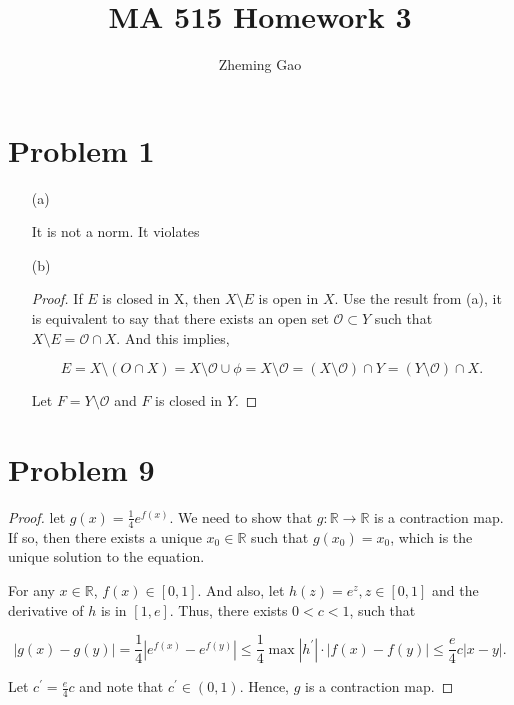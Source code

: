 \documentclass[12pt]{article}
\begin{document}
 
 
\title{MA 515 Homework 3}
\author{Zheming Gao}
\maketitle

\section*{Problem 1}

\begin{enumerate}
\item [(a)]

It is not a norm. It violates 







\vspace{60mm}

\item [(b)]

\begin{proof}

If $E$ is closed in X, then $X \setminus E$ is open in $X$. Use the result from (a), it is equivalent to say that there exists an open set $\mathcal{O} \subset Y$ such that $X\setminus E = \mathcal{O} \cap X$. And this implies,

$$
E = X\setminus (O\cap X) = X \setminus \mathcal{O} \cup \phi = X \setminus \mathcal{O} = ( X \setminus \mathcal{O}) \cap Y = (Y\setminus \mathcal{O}) \cap X.
$$

Let $F = Y\setminus \mathcal{O}$ and $F$ is closed in $Y$.

\end{proof}

\end{enumerate}


\section*{Problem 9}

\begin{proof}

let $g(x) = \frac{1}{4} e^{f(x)}$. We need to show that $g: \mathbb{R} \rightarrow \mathbb{R}$ is a contraction map. If so, then there exists a unique $x_0\in\mathbb{R}$ such that $g(x_0) = x_0$, which is the unique solution to the equation.

For any $x\in \mathbb{R}$, $f(x) \in [0, 1]$. And also, let $h(z) = e^z, z\in [0, 1]$ and the derivative of $h$ is in $[1, e]$. Thus, there exists $0<c<1$, such that

$$
|g(x) - g(y)| = \frac{1}{4}|e^{f(x)} - e^{f(y)}| \leqslant \frac{1}{4}\max |h^\prime|\cdot |f(x) - f(y)| \leqslant \frac{e}{4}c|x-y|.
$$

Let $c^\prime = \frac{e}{4}c$ and note that $c^\prime \in (0, 1)$. Hence, $g$ is a contraction map.


\end{proof}
\end{document}
